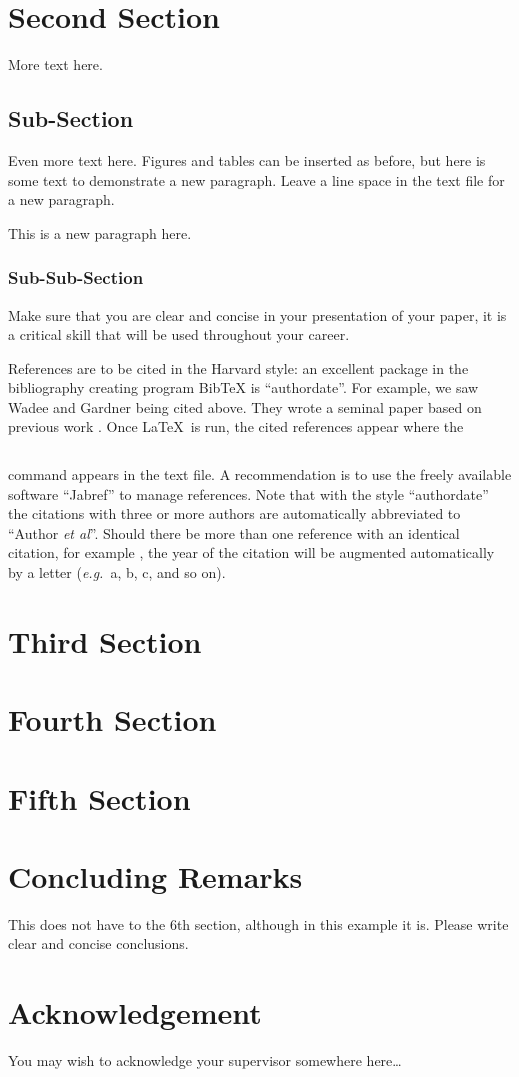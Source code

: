 \documentclass[12pt,number]{IC_fyp}
\begin{document}
\section{Second Section}
\label{sec:2nd}

More text here.

\subsection{Sub-Section}

Even more text here. Figures and tables can be inserted as before, but
here is some text to demonstrate a new paragraph. Leave a line space
in the text file for a new paragraph.

This is a new paragraph here.

\subsubsection{Sub-Sub-Section}

Make sure that you are clear and concise in your presentation of your
paper, it is a critical skill that will be used throughout your career.

References are to be cited in the Harvard style: an excellent package
in the bibliography creating program BibTeX is ``authordate''. For
example, we saw Wadee and Gardner 
being cited above. They wrote a seminal paper based on previous work
\cite{vk_sechler_donnell_1932,cherry_ltb_local_1960,nondyn}. Once
\LaTeX~is run, the cited references appear where the
\begin{verbatim}

\end{verbatim}
command appears in the text file. A recommendation is to use the freely
available software ``Jabref'' to manage references. Note that with the
style ``authordate'' the citations with three or more authors are
automatically abbreviated to ``Author \emph{et al}''. Should there be
more than one reference with an identical citation, for example
\cite{MAW_jsg}, the year of the citation will be augmented
automatically by a letter (\emph{e.g.}\ a, b, c, and so on).

\section{Third Section}

\section{Fourth Section}

\section{Fifth Section}

\section{Concluding Remarks}

This does not have to the 6th section, although in this example it
is. Please write clear and concise conclusions.

\section*{Acknowledgement}

You may wish to acknowledge your supervisor somewhere here\ldots


\end{document}
